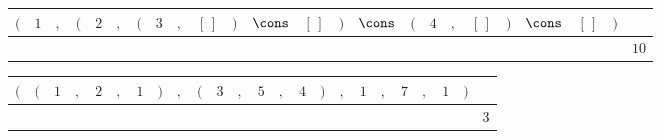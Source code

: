 {\scriptsize\setlength{\tabcolsep}{1.5pt}%
\begin{tabular}{ccccccccccccccccccccccc|l}
$($ & $1$ & $,$ & $($ & $2$ & $,$ & $($ & $3$ & $,$ & $[\,]$ & $)$ & $\cons$ & $[\,]$ & $)$ & $\cons$ & $($ & $4$ & $,$ & $[\,]$ & $)$ & $\cons$ & $[\,]$ & $)$ & \\ \hline
\gcell{$$} & \gcell{$\posD{\bullet}$} & \gcell{$\posC{\circ}$} & \gcell{$$} & \gcell{$\posD{\bullet}$} & \gcell{$\posC{\circ}$} & \gcell{$$} & \gcell{$\posD{\bullet}$} & \gcell{$\posC{\circ}$} & \gcell{$\posC{\circ}$} & \gcell{$$} & \gcell{$\posC{\circ}$} & \gcell{$\posC{\circ}$} & \gcell{$$} & \gcell{$\posC{\circ}$} & \gcell{$$} & \gcell{$\posD{\bullet}$} & \gcell{$\posC{\circ}$} & \gcell{$\posC{\circ}$} & \gcell{$$} & \gcell{$\posC{\circ}$} & \gcell{$\posC{\circ}$} & \gcell{$$} & $10$ \\
\end{tabular}}
{\scriptsize\setlength{\tabcolsep}{1.5pt}%
\begin{tabular}{ccccccccccccccccccccccc|l}
$($ & $($ & $1$ & $,$ & $2$ & $,$ & $1$ & $)$ & $,$ & $($ & $3$ & $,$ & $5$ & $,$ & $4$ & $)$ & $,$ & $1$ & $,$ & $7$ & $,$ & $1$ & $)$ & \\ \hline
\gcell{$$} & \gcell{$$} & \gcell{$\posD{\bullet}$} & \gcell{$\posC{\circ}$} & \gcell{$\posD{\bullet}$} & \gcell{$\posC{\circ}$} & \gcell{$\posD{\bullet}$} & \gcell{$$} & \gcell{$\posC{\circ}$} & \gcell{$$} & \gcell{$\posD{\bullet}$} & \gcell{$\posC{\circ}$} & \gcell{$\posD{\bullet}$} & \gcell{$\posC{\circ}$} & \gcell{$\posD{\bullet}$} & \gcell{$$} & \gcell{$\posC{\circ}$} & \gcell{$\posD{\bullet}$} & \gcell{$\posC{\circ}$} & \gcell{$$} & \gcell{$\posC{\circ}$} & \gcell{$\posD{\bullet}$} & \gcell{$$} & $3$ \\
\end{tabular}}
